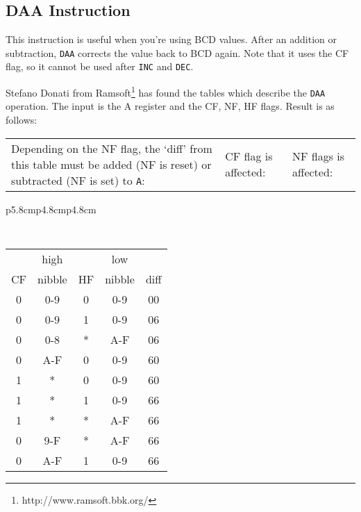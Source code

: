 \documentclass[12pt,twoside,openright,a4paper]{book}
\begin{document}
\subsection{DAA Instruction}
\label{daa}

This instruction is useful when you're using BCD values. After an addition or subtraction, {\tt DAA} corrects the value back to BCD again.  Note that it uses the CF flag, so it cannot be used after {\tt INC} and {\tt DEC}.

Stefano Donati from Ramsoft\footnote{http://www.ramsoft.bbk.org/} has found the tables which describe the {\tt DAA} operation. The input is the A register and the CF, NF, HF flags. Result is as follows:

{
	\footnotesize

	\begin{tabular}{b{5.8cm}b{4.8cm}b{4.8cm}}
		Depending on the NF flag, the `diff' from this table must be added (NF is reset) or subtracted (NF is set) to {\tt A}:
		&
		CF flag is affected:
		&
		NF flags is affected: \\
	\end{tabular}

	\begin{tabular}{p{5.8cm}p{4.8cm}p{4.8cm}}

		{\tt
			\begin{tabular}[t]{c|c|c|c|c}
				   &  high   &    & low    &  \\
				CF &  nibble & HF & nibble & diff \\
				\hline
				0 & 0-9     &  0 & 0-9    &  00  \\
				0 & 0-9     &  1 & 0-9    &  06  \\
				0 & 0-8     &  * & A-F    &  06  \\
				0 & A-F     &  0 & 0-9    &  60  \\
				1 &  *      &  0 & 0-9    &  60  \\
				1 &  *      &  1 & 0-9    &  66  \\
				1 &  *      &  * & A-F    &  66  \\
				0 & 9-F     &  * & A-F    &  66  \\
				0 & A-F     &  1 & 0-9    &  66  \\
				\hline
			\end{tabular}
		}


\end{tabular}}
\end{document}

